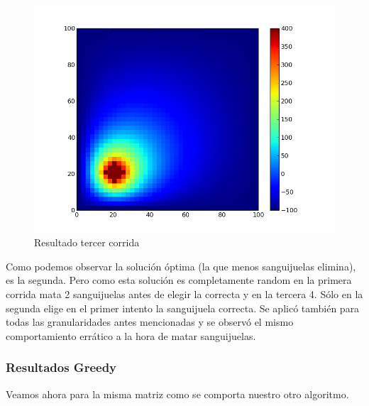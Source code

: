 \begin{figure}[htb]
\begin{center}
\includegraphics[scale=0.3]{imagenes/random_3.png} 
\caption{Resultado tercer corrida} 
\end{center}
\end{figure}
Como podemos observar la solución óptima (la que menos sanguijuelas elimina), es la segunda. Pero como esta solución es completamente random en la primera corrida mata 2 sanguijuelas antes de elegir 
la correcta y en la tercera 4. Sólo en la segunda elige en el primer intento la sanguijuela correcta. Se aplicó también para todas las granularidades antes mencionadas y se observó el mismo comportamiento errático a la hora
de matar sanguijuelas. 

\clearpage


\subsubsection{Resultados Greedy}

Veamos ahora para la misma matriz como se comporta nuestro otro algoritmo. 


